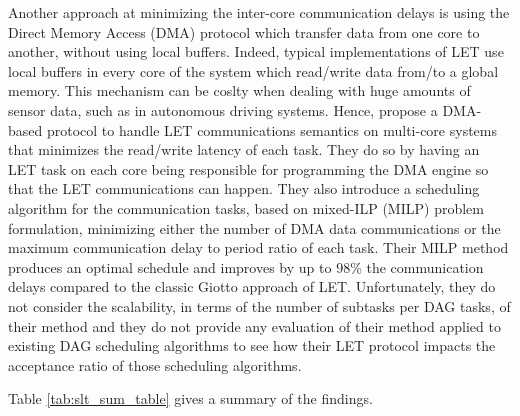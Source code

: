 Another approach at minimizing the inter-core communication delays
is using the Direct Memory Access (DMA) protocol
which transfer data from one core to another, without using local buffers.
Indeed, typical implementations of LET use 
local buffers in every core of the system
which read/write data from/to a global memory.
This mechanism can be coslty when dealing 
with huge amounts of sensor data, such as in
autonomous driving systems.
Hence, \cite{Pazzaglia2021DMALETtransfer}
propose a DMA-based protocol to handle LET communications semantics
on multi-core systems that minimizes the read/write latency of each task.
They do so by having an LET task on each core being responsible for 
programming the DMA engine so that the LET communications
can happen.
They also introduce a scheduling algorithm 
for the communication tasks, based on mixed-ILP (MILP)
problem formulation, minimizing either the
number of DMA data communications or 
the maximum communication delay to period ratio
of each task.
Their MILP method produces an optimal schedule
and improves by up to 98\% the communication delays
compared to the classic Giotto approach of LET\cite{henzinger2003giotto}.
Unfortunately, 
they do not consider the scalability, in terms of the number of subtasks
per DAG tasks, of their method and they do not provide any 
evaluation of their method applied to existing DAG scheduling algorithms
to see how their LET protocol impacts the acceptance ratio of those scheduling algorithms.

Table \ref{tab:slt_sum_table} gives a summary of the findings.

